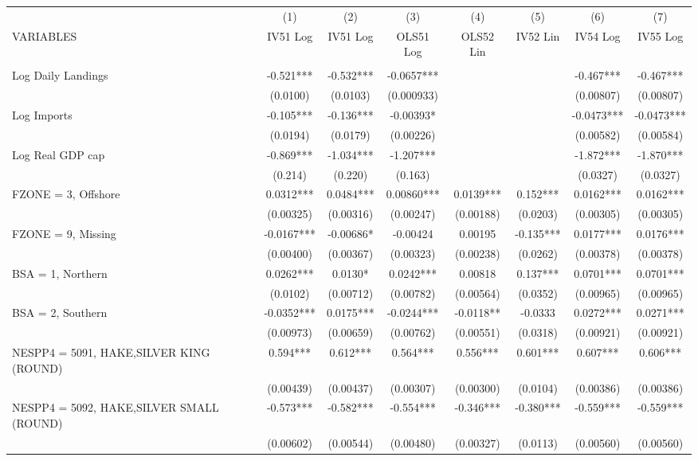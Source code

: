 \begin{tabular}{lccccccc} \hline
 & (1) & (2) & (3) & (4) & (5) & (6) & (7) \\
VARIABLES & IV51 Log & IV51 Log & OLS51 Log & OLS52 Lin & IV52 Lin & IV54 Log & IV55 Log \\ \hline
 &  &  &  &  &  &  &  \\
Log Daily Landings & -0.521*** & -0.532*** & -0.0657*** &  &  & -0.467*** & -0.467*** \\
 & (0.0100) & (0.0103) & (0.000933) &  &  & (0.00807) & (0.00807) \\
Log Imports & -0.105*** & -0.136*** & -0.00393* &  &  & -0.0473*** & -0.0473*** \\
 & (0.0194) & (0.0179) & (0.00226) &  &  & (0.00582) & (0.00584) \\
Log Real GDP cap & -0.869*** & -1.034*** & -1.207*** &  &  & -1.872*** & -1.870*** \\
 & (0.214) & (0.220) & (0.163) &  &  & (0.0327) & (0.0327) \\
FZONE = 3, Offshore & 0.0312*** & 0.0484*** & 0.00860*** & 0.0139*** & 0.152*** & 0.0162*** & 0.0162*** \\
 & (0.00325) & (0.00316) & (0.00247) & (0.00188) & (0.0203) & (0.00305) & (0.00305) \\
FZONE = 9, Missing & -0.0167*** & -0.00686* & -0.00424 & 0.00195 & -0.135*** & 0.0177*** & 0.0176*** \\
 & (0.00400) & (0.00367) & (0.00323) & (0.00238) & (0.0262) & (0.00378) & (0.00378) \\
BSA = 1, Northern & 0.0262*** & 0.0130* & 0.0242*** & 0.00818 & 0.137*** & 0.0701*** & 0.0701*** \\
 & (0.0102) & (0.00712) & (0.00782) & (0.00564) & (0.0352) & (0.00965) & (0.00965) \\
BSA = 2, Southern & -0.0352*** & 0.0175*** & -0.0244*** & -0.0118** & -0.0333 & 0.0272*** & 0.0271*** \\
 & (0.00973) & (0.00659) & (0.00762) & (0.00551) & (0.0318) & (0.00921) & (0.00921) \\
NESPP4 = 5091, HAKE,SILVER KING (ROUND) & 0.594*** & 0.612*** & 0.564*** & 0.556*** & 0.601*** & 0.607*** & 0.606*** \\
 & (0.00439) & (0.00437) & (0.00307) & (0.00300) & (0.0104) & (0.00386) & (0.00386) \\
NESPP4 = 5092, HAKE,SILVER SMALL (ROUND) & -0.573*** & -0.582*** & -0.554*** & -0.346*** & -0.380*** & -0.559*** & -0.559*** \\
 & (0.00602) & (0.00544) & (0.00480) & (0.00327) & (0.0113) & (0.00560) & (0.00560) \\

\end{tabular}
